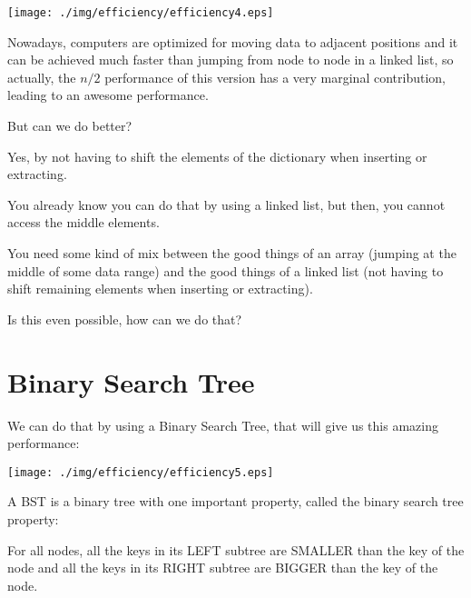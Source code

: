 \documentclass[a4paper, 9pt]{extarticle}
\begin{document}

\begin{multicols}{2}
\begin{center}
  \texttt{[image: ./img/efficiency/efficiency4.eps]}
\end{center}
\columnbreak

Nowadays, computers are optimized for moving data to adjacent positions and it
can be achieved much faster than jumping from node to node in a linked list, so
actually, the $n/2$ performance of this version has a very marginal
contribution, leading to an awesome performance.

But can we do better?

Yes, by not having to shift the elements of the dictionary when inserting or
extracting.

You already know you can do that by using a linked list, but then, you cannot
access the middle elements.

You need some kind of mix between the good things of an array (jumping at the
middle of some data range) and the good things of a linked list (not having to
shift remaining elements when inserting or extracting).

Is this even possible, how can we do that?

\end{multicols}



\newpage

\section{Binary Search Tree}

We can do that by using a Binary Search Tree, that will give us this amazing
performance:

\begin{center}
  \texttt{[image: ./img/efficiency/efficiency5.eps]}
\end{center}

A BST is a binary tree with one important property, called the binary search tree property:

\begin{blackboard}
  For all nodes,
        all the keys in its LEFT  subtree are SMALLER than the key of the node
    and all the keys in its RIGHT subtree are BIGGER  than the key of the node.
\end{blackboard}
\end{document}
